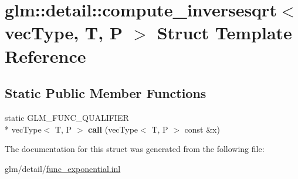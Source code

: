 \hypertarget{structglm_1_1detail_1_1compute__inversesqrt}{\section{glm\-:\-:detail\-:\-:compute\-\_\-inversesqrt$<$ vec\-Type, T, P $>$ Struct Template Reference}
\label{structglm_1_1detail_1_1compute__inversesqrt}
}
\subsection*{Static Public Member Functions}
\begin{DoxyCompactItemize}
\item 
\hypertarget{structglm_1_1detail_1_1compute__inversesqrt_a691942b1bfc04c3563e179ff2fef5375}{static G\-L\-M\-\_\-\-F\-U\-N\-C\-\_\-\-Q\-U\-A\-L\-I\-F\-I\-E\-R \\*
vec\-Type$<$ T, P $>$ {\bfseries call} (vec\-Type$<$ T, P $>$ const \&x)}\label{structglm_1_1detail_1_1compute__inversesqrt_a691942b1bfc04c3563e179ff2fef5375}

\end{DoxyCompactItemize}


The documentation for this struct was generated from the following file\-:\begin{DoxyCompactItemize}
\item 
glm/detail/\hyperlink{func__exponential_8inl}{func\-\_\-exponential.\-inl}\end{DoxyCompactItemize}
